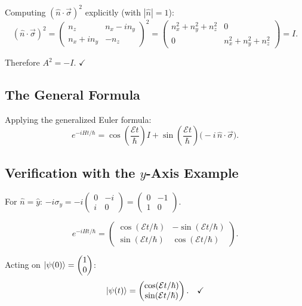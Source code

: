 \documentclass[11pt,a4paper]{article}
\theoremstyle{definition}
\theoremstyle{plain}
\theoremstyle{remark}
\begin{document}
Computing $(\hat{n}\cdot\vec{\sigma})^2$ explicitly (with $|\hat{n}|=1$):
\[
    (\hat{n}\cdot\vec{\sigma})^2 = \begin{pmatrix}n_z & n_x-in_y \\ n_x+in_y & -n_z\end{pmatrix}^2 = \begin{pmatrix}n_x^2+n_y^2+n_z^2 & 0 \\ 0 & n_x^2+n_y^2+n_z^2\end{pmatrix} = I.
\]

Therefore $A^2 = -I$. $\checkmark$

\subsection{The General Formula}

Applying the generalized Euler formula:
\[
    \boxed{e^{-iHt/\hbar} = \cos\!\left(\frac{\mathcal{E}t}{\hbar}\right)I + \sin\!\left(\frac{\mathcal{E}t}{\hbar}\right)\bigl(-i\,\hat{n}\cdot\vec{\sigma}\bigr).}
\]

\subsection{Verification with the $y$-Axis Example}

For $\hat{n} = \hat{y}$: $-i\sigma_y = -i\begin{pmatrix}0&-i\\i&0\end{pmatrix} = \begin{pmatrix}0&-1\\1&0\end{pmatrix}$.

\[
    e^{-iHt/\hbar} = \begin{pmatrix}\cos(\mathcal{E}t/\hbar) & -\sin(\mathcal{E}t/\hbar) \\ \sin(\mathcal{E}t/\hbar) & \cos(\mathcal{E}t/\hbar)\end{pmatrix}.
\]

Acting on $\ket{\psi(0)} = \begin{pmatrix}1\\0\end{pmatrix}$:
\[
    \ket{\psi(t)} = \begin{pmatrix}\cos(\mathcal{E}t/\hbar)\\\sin(\mathcal{E}t/\hbar)\end{pmatrix}. \quad\checkmark
\]

\end{document}

